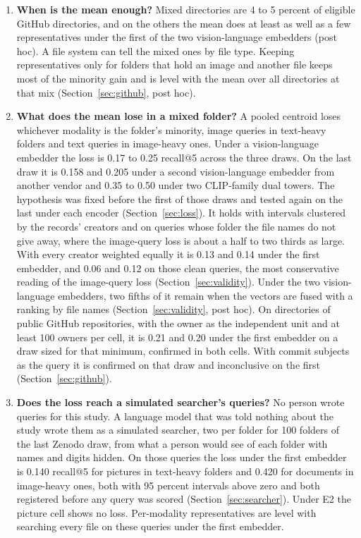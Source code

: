 \documentclass[11pt]{article}
\begin{document}
\begin{enumerate}
\item \textbf{When is the mean enough?} Mixed directories are 4 to 5 percent of eligible GitHub directories, and on the others the mean does at least as well as a few representatives under the first of the two vision-language embedders (post hoc). A file system can tell the mixed ones by file type. Keeping representatives only for folders that hold an image and another file keeps most of the minority gain and is level with the mean over all directories at that mix (Section~\ref{sec:github}, post hoc).
\item \textbf{What does the mean lose in a mixed folder?} A pooled centroid loses whichever modality is the folder's minority, image queries in text-heavy folders and text queries in image-heavy ones. Under a vision-language embedder the loss is 0.17 to 0.25 recall@5 across the three draws. On the last draw it is 0.158 and 0.205 under a second vision-language embedder from another vendor and 0.35 to 0.50 under two CLIP-family dual towers. The hypothesis was fixed before the first of those draws and tested again on the last under each encoder (Section~\ref{sec:loss}). It holds with intervals clustered by the records' creators and on queries whose folder the file names do not give away, where the image-query loss is about a half to two thirds as large. With every creator weighted equally it is 0.13 and 0.14 under the first embedder, and 0.06 and 0.12 on those clean queries, the most conservative reading of the image-query loss (Section~\ref{sec:validity}). Under the two vision-language embedders, two fifths of it remain when the vectors are fused with a ranking by file names (Section~\ref{sec:validity}, post hoc). On directories of public GitHub repositories, with the owner as the independent unit and at least 100 owners per cell, it is 0.21 and 0.20 under the first embedder on a draw sized for that minimum, confirmed in both cells. With commit subjects as the query it is confirmed on that draw and inconclusive on the first (Section~\ref{sec:github}).
\item \textbf{Does the loss reach a simulated searcher's queries?} No person wrote queries for this study. A language model that was told nothing about the study wrote them as a simulated searcher, two per folder for 100 folders of the last Zenodo draw, from what a person would see of each folder with names and digits hidden. On those queries the loss under the first embedder is 0.140 recall@5 for pictures in text-heavy folders and 0.420 for documents in image-heavy ones, both with 95 percent intervals above zero and both registered before any query was scored (Section~\ref{sec:searcher}). Under E2 the picture cell shows no loss. Per-modality representatives are level with searching every file on these queries under the first embedder.

\end{enumerate}
\end{document}
